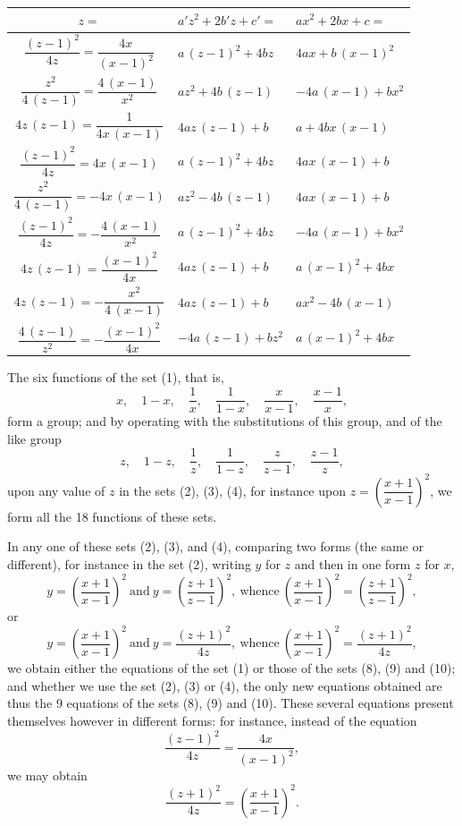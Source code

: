 \documentclass[11pt,a4paper]{book}
\begin{document}
\begin{center}
\small
\begin{tabular}{|c|l|l|}
\hline
$z=$ & $a'z^2+2b'z+c'=$ & $ax^2+2bx+c=$\\
\hline
$\dfrac{(z-1)^2}{4z}=\dfrac{4x}{(x-1)^2}$ & $a\,(z-1)^2+4bz$ & $4ax+b\,(x-1)^2$\\
$\dfrac{z^2}{4\,(z-1)}=\dfrac{4\,(x-1)}{x^2}$ & $az^2+4b\,(z-1)$ & $-4a\,(x-1)+bx^2$\\
$4z\,(z-1)=\dfrac{1}{4x\,(x-1)}$ & $4az\,(z-1)+b$ & $a+4bx\,(x-1)$\\
\hline
$\dfrac{(z-1)^2}{4z}=4x\,(x-1)$ & $a\,(z-1)^2+4bz$ & $4ax\,(x-1)+b$\\
$\dfrac{z^2}{4\,(z-1)}=-4x\,(x-1)$ & $az^2-4b\,(z-1)$ & $4ax\,(x-1)+b$\\
$\dfrac{(z-1)^2}{4z}=-\dfrac{4\,(x-1)}{x^2}$ & $a\,(z-1)^2+4bz$ & $-4a\,(x-1)+bx^2$\\
\hline
$4z\,(z-1)=\dfrac{(x-1)^2}{4x}$ & $4az\,(z-1)+b$ & $a\,(x-1)^2+4bx$\\
$4z\,(z-1)=-\dfrac{x^2}{4\,(x-1)}$ & $4az\,(z-1)+b$ & $ax^2-4b\,(x-1)$\\
$\dfrac{4\,(z-1)}{z^2}=-\dfrac{(x-1)^2}{4x}$ & $-4a\,(z-1)+bz^2$ & $a\,(x-1)^2+4bx$\\
\hline
\end{tabular}
\end{center}
\normalsize

\smallskip

The six functions of the set (1), that is,
\[
x,\quad 1-x,\quad \frac{1}{x},\quad \frac{1}{1-x},\quad \frac{x}{x-1},\quad \frac{x-1}{x},
\]
form a group; and by operating with the substitutions of this group, and of the like group
\[
z,\quad 1-z,\quad \frac{1}{z},\quad \frac{1}{1-z},\quad \frac{z}{z-1},\quad \frac{z-1}{z},
\]
upon any value of $z$ in the sets (2), (3), (4), for instance upon $z=\left(\dfrac{x+1}{x-1}\right)^2$, we form all the 18 functions of these sets.

In any one of these sets (2), (3), and (4), comparing two forms (the same or different), for instance in the set (2), writing $y$ for $z$ and then in one form $z$ for $x$,
\[
y=\left(\frac{x+1}{x-1}\right)^2\ \text{and}\ 
y=\left(\frac{z+1}{z-1}\right)^2,\ \text{whence}\ 
\left(\frac{x+1}{x-1}\right)^2=\left(\frac{z+1}{z-1}\right)^2,
\]
or
\[
y=\left(\frac{x+1}{x-1}\right)^2\ \text{and}\ 
y=\frac{(z+1)^2}{4z},\ \text{whence}\ 
\left(\frac{x+1}{x-1}\right)^2=\frac{(z+1)^2}{4z},
\]
we obtain either the equations of the set (1) or those of the sets (8), (9) and (10); and whether we use the set (2), (3) or (4), the only new equations obtained are thus the 9 equations of the sets (8), (9) and (10). These several equations present themselves however in different forms: for instance, instead of the equation
\[
\frac{(z-1)^2}{4z}=\frac{4x}{(x-1)^2},
\]
we may obtain
\[
\frac{(z+1)^2}{4z}=\left(\frac{x+1}{x-1}\right)^2.
\]
\end{document}
